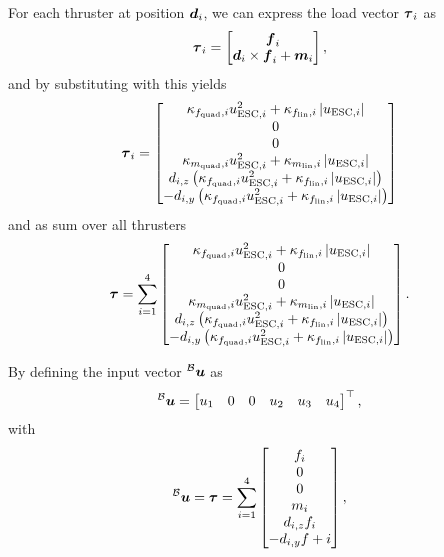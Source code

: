 For each thruster at position $\mbox{$\bm{d}$}_{i}$, we can express the load vector $\mbox{$\bm{\tau}$}_{i}$ as
\begin{equation}
	\label{eq:load-per-thruster-short}
	\mbox{$\bm{\tau}$}_{i} = 
	\begin{bmatrix}
		\mbox{$\bm{f}$}_i \\
		\mbox{$\bm{d}$}_i \times \mbox{$\bm{f}$}_i + \mbox{$\bm{m}$}_i
	\end{bmatrix}
	,
\end{equation}
and by substituting with  this yields
\begin{equation}
	\mbox{$\bm{\tau}$}_{i} = 
	\begin{bmatrix}
		\kappa_{f_{\text{quad}}, i} u_{\text{ESC},i}^2
		+ \kappa_{f_{\text{lin}}, i} \left\lvert u_{\text{ESC},i} \right\rvert
		\\
		0 \\
		0 \\
		\kappa_{m_{\text{quad}}, i} u_{\text{ESC},i}^2
		+ \kappa_{m_{\text{lin}}, i} \left\lvert u_{\text{ESC},i} \right\rvert
		\\
		d_{i,z}
		\left(
			\kappa_{f_{\text{quad}}, i} u_{\text{ESC},i}^2
			+ \kappa_{f_{\text{lin}}, i} \left\lvert u_{\text{ESC},i} \right\rvert
		\right)
		\\
		-d_{i,y}
		\left(
			\kappa_{f_{\text{quad}}, i} u_{\text{ESC},i}^2
			+ \kappa_{f_{\text{lin}}, i} \left\lvert u_{\text{ESC},i} \right\rvert
		\right)
	\end{bmatrix}
\end{equation}
and as sum over all thrusters
\begin{equation}
	\label{eq:thruster-load-vs-uesc}
	\mbox{$\bm{\tau}$} = 
	\sum_{i=1}^{4}
	\begin{bmatrix}
		\kappa_{f_{\text{quad}}, i} u_{\text{ESC},i}^2
		+ \kappa_{f_{\text{lin}}, i} \left\lvert u_{\text{ESC},i} \right\rvert
		\\
		0 \\
		0 \\
		\kappa_{m_{\text{quad}}, i} u_{\text{ESC},i}^2
		+ \kappa_{m_{\text{lin}}, i} \left\lvert u_{\text{ESC},i} \right\rvert
		\\
		d_{i,z}
		\left(
			\kappa_{f_{\text{quad}}, i} u_{\text{ESC},i}^2
			+ \kappa_{f_{\text{lin}}, i} \left\lvert u_{\text{ESC},i} \right\rvert
		\right)
		\\
		-d_{i,y}
		\left(
			\kappa_{f_{\text{quad}}, i} u_{\text{ESC},i}^2
			+ \kappa_{f_{\text{lin}}, i} \left\lvert u_{\text{ESC},i} \right\rvert
		\right)
	\end{bmatrix}
	.
\end{equation}

By defining the input vector $\prescript{\mathcal{B}}{}{\mbox{$\bm{u}$}}$ as
\begin{equation}
	\label{eq:input-vector}
	\prescript{\mathcal{B}}{}{\mbox{$\bm{u}$}} =
	\begin{bmatrix}
		u_1 &
		0 &
		0 &
		u_2 &
		u_3 &
		u_4 
	\end{bmatrix}^\top
	,
\end{equation}
with
\begin{equation}
	\prescript{\mathcal{B}}{}{\mbox{$\bm{u}$}} = \mbox{$\bm{\tau}$} =
	\sum_{i=1}^{4}
	\begin{bmatrix}
		f_i \\
		0 \\
		0 \\
		m_i \\
		d_{i, z} f_i\\
		-d_{i, y} f+i
	\end{bmatrix}
	,
\end{equation}


